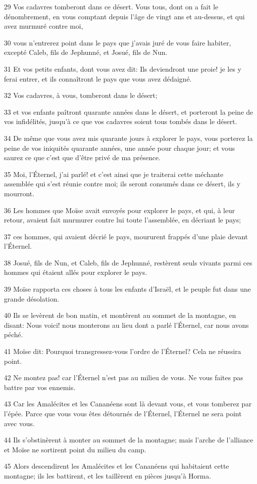 \par 29 Vos cadavres tomberont dans ce désert. Vous tous, dont on a fait le dénombrement, en vous comptant depuis l'âge de vingt ans et au-dessus, et qui avez murmuré contre moi,
\par 30 vous n'entrerez point dans le pays que j'avais juré de vous faire habiter, excepté Caleb, fils de Jephunné, et Josué, fils de Nun.
\par 31 Et vos petits enfants, dont vous avez dit: Ils deviendront une proie! je les y ferai entrer, et ils connaîtront le pays que vous avez dédaigné.
\par 32 Vos cadavres, à vous, tomberont dans le désert;
\par 33 et vos enfants paîtront quarante années dans le désert, et porteront la peine de vos infidélités, jusqu'à ce que vos cadavres soient tous tombés dans le désert.
\par 34 De même que vous avez mis quarante jours à explorer le pays, vous porterez la peine de vos iniquités quarante années, une année pour chaque jour; et vous saurez ce que c'est que d'être privé de ma présence.
\par 35 Moi, l'Éternel, j'ai parlé! et c'est ainsi que je traiterai cette méchante assemblée qui s'est réunie contre moi; ils seront consumés dans ce désert, ils y mourront.
\par 36 Les hommes que Moïse avait envoyés pour explorer le pays, et qui, à leur retour, avaient fait murmurer contre lui toute l'assemblée, en décriant le pays;
\par 37 ces hommes, qui avaient décrié le pays, moururent frappés d'une plaie devant l'Éternel.
\par 38 Josué, fils de Nun, et Caleb, fils de Jephunné, restèrent seuls vivants parmi ces hommes qui étaient allés pour explorer le pays.
\par 39 Moïse rapporta ces choses à tous les enfants d'Israël, et le peuple fut dans une grande désolation.
\par 40 Ils se levèrent de bon matin, et montèrent au sommet de la montagne, en disant: Nous voici! nous monterons au lieu dont a parlé l'Éternel, car nous avons péché.
\par 41 Moïse dit: Pourquoi transgressez-vous l'ordre de l'Éternel? Cela ne réussira point.
\par 42 Ne montez pas! car l'Éternel n'est pas au milieu de vous. Ne vous faites pas battre par vos ennemis.
\par 43 Car les Amalécites et les Cananéens sont là devant vous, et vous tomberez par l'épée. Parce que vous vous êtes détournés de l'Éternel, l'Éternel ne sera point avec vous.
\par 44 Ils s'obstinèrent à monter au sommet de la montagne; mais l'arche de l'alliance et Moïse ne sortirent point du milieu du camp.
\par 45 Alors descendirent les Amalécites et les Cananéens qui habitaient cette montagne; ils les battirent, et les taillèrent en pièces jusqu'à Horma.

